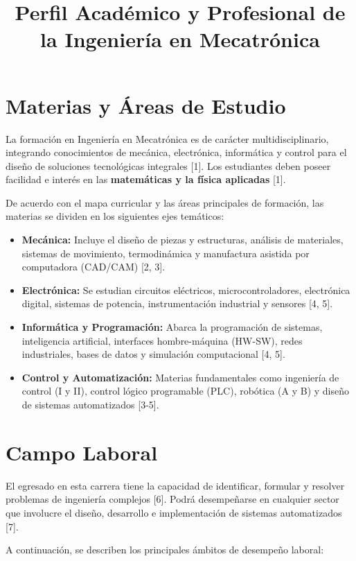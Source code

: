 \documentclass[12pt]{article}
\title{Perfil Académico y Profesional de la Ingeniería en Mecatrónica}
\author{}
\date{}
\begin{document}
\maketitle

\section{Materias y Áreas de Estudio}

La formación en Ingeniería en Mecatrónica es de carácter multidisciplinario, integrando conocimientos de mecánica, electrónica, informática y control para el diseño de soluciones tecnológicas integrales [1]. Los estudiantes deben poseer facilidad e interés en las \textbf{matemáticas y la física aplicadas} [1].

De acuerdo con el mapa curricular y las áreas principales de formación, las materias se dividen en los siguientes ejes temáticos:

\begin{itemize}
    \item \textbf{Mecánica:} Incluye el diseño de piezas y estructuras, análisis de materiales, sistemas de movimiento, termodinámica y manufactura asistida por computadora (CAD/CAM) [2, 3].
    \item \textbf{Electrónica:} Se estudian circuitos eléctricos, microcontroladores, electrónica digital, sistemas de potencia, instrumentación industrial y sensores [4, 5].
    \item \textbf{Informática y Programación:} Abarca la programación de sistemas, inteligencia artificial, interfaces hombre-máquina (HW-SW), redes industriales, bases de datos y simulación computacional [4, 5].
    \item \textbf{Control y Automatización:} Materias fundamentales como ingeniería de control (I y II), control lógico programable (PLC), robótica (A y B) y diseño de sistemas automatizados [3-5].
\end{itemize}

\section{Campo Laboral}

El egresado en esta carrera tiene la capacidad de identificar, formular y resolver problemas de ingeniería complejos [6]. Podrá desempeñarse en cualquier sector que involucre el diseño, desarrollo e implementación de sistemas automatizados [7].

A continuación, se describen los principales ámbitos de desempeño laboral:
\end{document}
